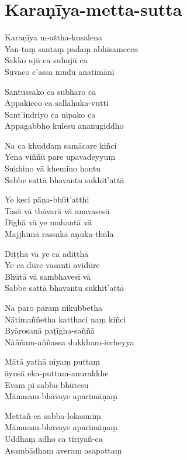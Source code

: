 \chapter{Karaṇīya-metta-sutta}%


\begin{paritta}
Karaṇīya m-attha-kusalena\\
Yan-taṃ santaṃ padaṃ abhisamecca\\
Sakko ujū ca suhujū ca\\
Suvaco c'assa mudu anatimānī

Santussako ca subharo ca\\
Appakicco ca sallahuka-vutti\\
Sant'indriyo ca nipako ca\\
Appagabbho kulesu ananugiddho

Na ca khuddaṃ samācare kiñci\\
Yena viññū pare upavadeyyuṃ\\
Sukhino vā khemino hontu\\
Sabbe sattā bhavantu sukhit'attā

\enlargethispage{\baselineskip}

Ye keci pāṇa-bhūt'atthi\\
Tasā vā thāvarā vā anavasesā\\
Dīghā vā ye mahantā vā\\
Majjhimā rassakā aṇuka-thūlā

Diṭṭhā vā ye ca adiṭṭhā\\
Ye ca dūre vasanti avidūre\\
Bhūtā vā sambhavesī vā\\
Sabbe sattā bhavantu sukhit'attā

Na paro paraṃ nikubbetha\\
Nātimaññetha katthaci naṃ kiñci\\
Byārosanā paṭīgha-saññā\\
Nāññam-aññassa dukkham-iccheyya

Mātā yathā niyaṃ puttaṃ\\
āyusā eka-puttam-anurakkhe\\
Evam pi sabba-bhūtesu\\
Mānasam-bhāvaye aparimāṇaṃ

Mettañ-ca sabba-lokasmiṃ\\
Mānasam-bhāvaye aparimāṇaṃ\\
Uddhaṃ adho ca tiriyañ-ca\\
Asambādhaṃ averaṃ asapattaṃ


\end{paritta}
